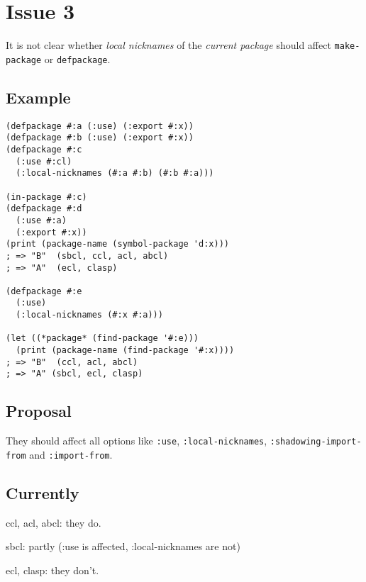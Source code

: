 \documentclass[11pt]{article}
\author{Grolter Bell}
\date{\today}
\title{}
\begin{document}
\section{Issue 3}
\label{sec:orgab19df5}
It is not clear whether \emph{local nicknames} of the \emph{current package} should
affect \texttt{make-package} or \texttt{defpackage}.
\subsection{Example}
\label{sec:org5212ab8}
\begin{verbatim}
(defpackage #:a (:use) (:export #:x))
(defpackage #:b (:use) (:export #:x))
(defpackage #:c
  (:use #:cl)
  (:local-nicknames (#:a #:b) (#:b #:a)))

(in-package #:c)
(defpackage #:d
  (:use #:a)
  (:export #:x))
(print (package-name (symbol-package 'd:x)))
; => "B"  (sbcl, ccl, acl, abcl)
; => "A"  (ecl, clasp)

(defpackage #:e
  (:use)
  (:local-nicknames (#:x #:a)))

(let ((*package* (find-package '#:e)))
  (print (package-name (find-package '#:x))))
; => "B"  (ccl, acl, abcl)
; => "A" (sbcl, ecl, clasp)
\end{verbatim}
\subsection{Proposal}
\label{sec:org7f2da0b}
They should affect all options like \texttt{:use}, \texttt{:local-nicknames},
\texttt{:shadowing-import-from} and \texttt{:import-from}.
\subsection{Currently}
\label{sec:org6dc44e4}
ccl, acl, abcl: they do.

sbcl: partly (:use is affected, :local-nicknames are not)

ecl, clasp: they don't.
\end{document}
